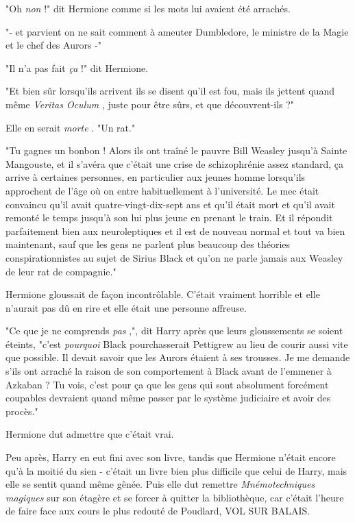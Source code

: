 "Oh \emph{non}  !" dit Hermione comme si les mots lui avaient été arrachés.

"- et parvient on ne sait comment à ameuter Dumbledore, le ministre de la Magie et le chef des Aurors -"

"Il n'a pas fait \emph{ça}  !" dit Hermione.

"Et bien sûr lorsqu'ils arrivent ils se disent qu'il est fou, mais ils jettent quand même \emph{Veritas Oculum} , juste pour être sûrs, et que découvrent-ils ?"

Elle en serait \emph{morte} . "Un rat."

"Tu gagnes un bonbon ! Alors ils ont traîné le pauvre Bill Weasley jusqu'à Sainte Mangouste, et il s'avéra que c'était une crise de schizophrénie assez standard, ça arrive à certaines personnes, en particulier aux jeunes homme lorsqu'ils approchent de l'âge où on entre habituellement à l'université. Le mec était convaincu qu'il avait quatre-vingt-dix-sept ans et qu'il était mort et qu'il avait remonté le temps jusqu'à son lui plus jeune en prenant le train. Et il répondit parfaitement bien aux neuroleptiques et il est de nouveau normal et tout va bien maintenant, sauf que les gens ne parlent plus beaucoup des théories conspirationnistes au sujet de Sirius Black et qu'on ne parle jamais aux Weasley de leur rat de compagnie."

Hermione gloussait de façon incontrôlable. C'était vraiment horrible et elle n'aurait pas dû en rire et elle était une personne affreuse.

"Ce que je ne comprends \emph{pas} ,", dit Harry après que leurs gloussements se soient éteints, "c'est \emph{pourquoi}  Black pourchasserait Pettigrew au lieu de courir aussi vite que possible. Il devait savoir que les Aurors étaient à ses trousses. Je me demande s'ils ont arraché la raison de son comportement à Black avant de l'emmener à Azkaban ? Tu vois, c'est pour ça que les gens qui sont absolument forcément coupables devraient quand même passer par le système judiciaire et avoir des procès."

Hermione dut admettre que c'était vrai.

Peu après, Harry en eut fini avec son livre, tandis que Hermione n'était encore qu'à la moitié du sien - c'était un livre bien plus difficile que celui de Harry, mais elle se sentit quand même gênée. Puis elle dut remettre \emph{Mnémotechniques magiques}  sur son étagère et se forcer à quitter la bibliothèque, car c'était l'heure de faire face aux cours le plus redouté de Poudlard, VOL SUR BALAIS.

